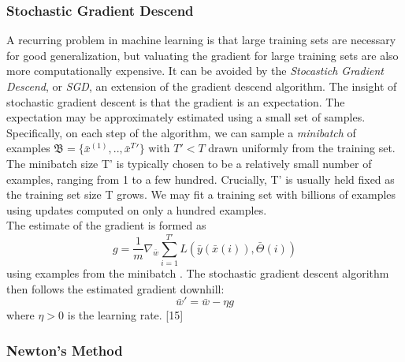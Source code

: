 \subsubsection{Stochastic Gradient Descend}
A recurring problem in machine learning is that large training sets are necessary for good generalization, but valuating the gradient for large training sets are also more computationally expensive. 
It can be avoided by the \emph{Stocastich Gradient Descend}, or \emph{SGD}, an extension of the gradient descend algorithm.
The insight of stochastic gradient descent is that the gradient is an expectation. The expectation may be approximately estimated using a small set of samples. Speciﬁcally, on each step of the algorithm, we can sample a \emph{minibatch} of examples $\mathfrak{B}=\{\bar{x}^(1),..,\bar{x}^T' \}$ with $T'<T$ drawn uniformly from the training set. The minibatch size T' is typically chosen to be a relatively small number of examples, ranging from 1 to a few hundred. Crucially, T' is usually held ﬁxed as the training set size T grows. We may ﬁt a training set with billions of examples using updates computed on only a hundred examples. \\
The estimate of the gradient is formed as 
$$g=\frac{1}{m} \nabla_{\bar{w}} \sum_{i=1}^{T'} L(\bar{y}(\bar{x}(i) ), \bar{\Theta}(i))$$ 
using examples from the minibatch . The stochastic gradient descent algorithm then follows the estimated gradient downhill:
$$\bar{w}'=\bar{w}-\eta g$$
where $\eta>0$ is the learning rate. [15]


\subsubsection{Newton's Method}

